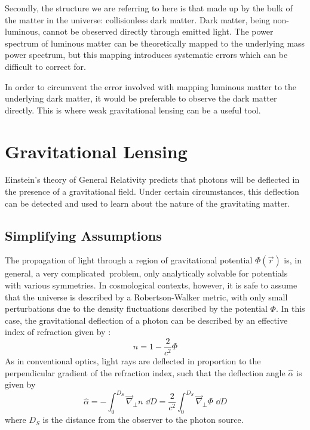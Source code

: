 Secondly, the structure we are referring to here is that made up by the bulk
of the matter in the universe: collisionless dark matter.  Dark matter,
being non-luminous, cannot be obeserved directly through emitted light.
The power spectrum of luminous matter can be theoretically mapped to the
underlying mass power spectrum, but this mapping introduces systematic
errors which can be difficult to correct for.

In order to circumvent the error involved with mapping luminous matter to
the underlying dark matter, it would be preferable to observe the dark
matter directly.  This is where weak gravitational lensing can be a
useful tool.



\section{Gravitational Lensing}
\label{sec:gravitational_lensing}
Einstein's theory of General Relativity predicts that photons will be deflected
in the presence of a gravitational field.  Under certain circumstances, this
deflection can be detected and used to learn about the nature of the
gravitating matter.

\subsection{Simplifying Assumptions}
\label{sec:lensing_simplification}
The propagation of light through a region of gravitational potential
$\Phi(\vec{r})$ is, in general, a very complicated\ problem, only analytically
solvable for potentials with various symmetries.  In cosmological contexts,
however, it is safe to assume that the universe is described by a
Robertson-Walker metric, with only small perturbations due to the density
fluctuations described by the potential $\Phi$.  In this case, the
gravitational deflection of a photon can be described by an effective
index of refraction given by 
\citep[see][and references therein]{narayan1996lectures}:
\begin{equation}
  n = 1-\frac{2}{c^2}\Phi 
\end{equation}
As in conventional optics, light rays are deflected in proportion to the
perpendicular gradient of the refraction index, such that the deflection angle
$\hat{\alpha}$ is given by
\begin{equation}
  \label{eq:alpha-def}
  \hat{\alpha} = -\int_0^{D_S} \vec{\nabla}_\perp n \,\,\dd D
  = \frac{2}{c^2}\int_0^{D_S} \vec{\nabla}_\perp\Phi\,\,\dd D
\end{equation}
where $D_S$ is the distance from the observer to the photon source.  

